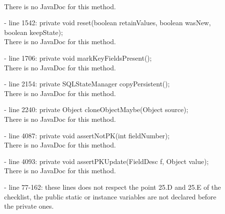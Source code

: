 \documentclass[18pt,oneside,a4paper, titlepage]{article}
\begin{document}
\begin{itemize}
\begin{itemize}
				\\There is no JavaDoc for this method.
				\item[-] line 1542: private void reset(boolean retainValues, boolean wasNew, boolean keepState);
				\\There is no JavaDoc for this method.
				\item[-] line 1706: private void markKeyFieldsPresent();
				\\There is no JavaDoc for this method.
				\item[-] line 2154: private SQLStateManager copyPersistent();
				\\There is no JavaDoc for this method.
				\item[-] line 2240: private Object cloneObjectMaybe(Object source);
				\\There is no JavaDoc for this method.
				\item[-] line 4087: private void assertNotPK(int fieldNumber);
				\\There is no JavaDoc for this method.
				\item[-] line 4093: private void assertPKUpdate(FieldDesc f, Object value);
				\\There is no JavaDoc for this method.
				\item[-] line 77-162: these lines does not respect the point 25.D and 25.E of the checklist, the public static or instance variables are not declared before the private ones.
				

\end{itemize}
\end{itemize}
\end{document}
